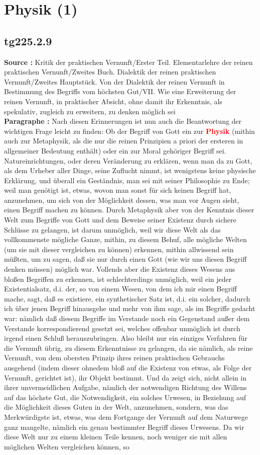\documentclass[a4paper,12pt,twoside]{book}
\newcommand{\match}[1]{\textcolor{red}{\textbf{#1}}}
\newcommand{\unnumberedsection}[1]{
	\section*{#1}
	\addcontentsline{toc}{section}{#1}
	\markright{#1}
}
\begin{document}
	\unnumberedsection{Physik (1)} 
	\subsection*{tg225.2.9} 
	\textbf{Source : }Kritik der praktischen Vernunft/Erster Teil. Elementarlehre der reinen praktischen Vernunft/Zweites Buch. Dialektik der reinen praktischen Vernunft/Zweites Hauptstück. Von der Dialektik der reinen Vernunft in Bestimmung des Begriffs vom höchsten Gut/VII. Wie eine Erweiterung der reinen Vernunft, in praktischer Absicht, ohne damit ihr Erkenntnis, als spekulativ, zugleich zu erweitern, zu denken möglich sei\\  
	
	\textbf{Paragraphe : }Nach diesen Erinnerungen ist nun auch die Beantwortung der wichtigen Frage leicht zu finden: Ob der Begriff von Gott ein zur \match{Physik} (mithin auch zur Metaphysik, als die nur die reinen Prinzipien a priori der ersteren in allgemeiner  Bedeutung enthält) oder ein zur Moral gehöriger Begriff sei. Natureinrichtungen, oder deren Veränderung zu erklären, wenn man da zu Gott, als dem Urheber aller Dinge, seine Zuflucht nimmt, ist wenigstens keine physische Erklärung, und überall ein Geständnis, man sei mit seiner Philosophie zu Ende; weil man genötigt ist, etwas, wovon man sonst für sich keinen Begriff hat, anzunehmen, um sich von der Möglichkeit dessen, was man vor Augen sieht, einen Begriff machen zu können. Durch Metaphysik aber von der Kenntnis dieser Welt zum Begriffe von Gott und dem Beweise seiner Existenz durch sichere Schlüsse zu gelangen, ist darum unmöglich, weil wir diese Welt als das vollkommenste mögliche Ganze, mithin, zu diesem Behuf, alle mögliche Welten (um sie mit dieser vergleichen zu können) erkennen, mithin allwissend sein müßten, um zu sagen, daß sie nur durch einen Gott (wie wir uns diesen Begriff denken müssen) möglich war. Vollends aber die Existenz dieses Wesens aus bloßen Begriffen zu erkennen, ist schlechterdings unmöglich, weil ein jeder Existentialsatz, d.i. der, so von einem Wesen, von dem ich mir einen Begriff mache, sagt, daß es existiere, ein synthetischer Satz ist, d.i. ein solcher, dadurch ich über jenen Begriff hinausgehe und mehr von ihm sage, als im Begriffe gedacht war: nämlich daß diesem Begriffe im Verstande noch ein Gegenstand außer dem Verstande korrespondierend gesetzt sei, welches offenbar unmöglich ist durch irgend einen Schluß herauszubringen. Also bleibt nur ein einziges Verfahren für die Vernunft übrig, zu diesem Erkenntnisse zu gelangen, da sie nämlich, als reine Vernunft, von dem obersten Prinzip ihres reinen praktischen Gebrauchs ausgehend (indem dieser ohnedem bloß auf die Existenz von etwas, als Folge der Vernunft, gerichtet ist), ihr Objekt bestimmt. Und da zeigt sich, nicht allein in ihrer unvermeidlichen Aufgabe, nämlich der notwendigen Richtung des Willens auf das höchste Gut, die Notwendigkeit, ein solches Urwesen, in Beziehung auf die Möglichkeit dieses Guten in der Welt, anzunehmen, sondern, was das Merkwürdigste ist, etwas, was dem Fortgange der Vernunft auf dem Naturwege ganz  mangelte, nämlich ein genau bestimmter Begriff dieses Urwesens. Da wir diese Welt nur zu einem kleinen Teile kennen, noch weniger sie mit allen möglichen Welten vergleichen können, so 
\end{document}
